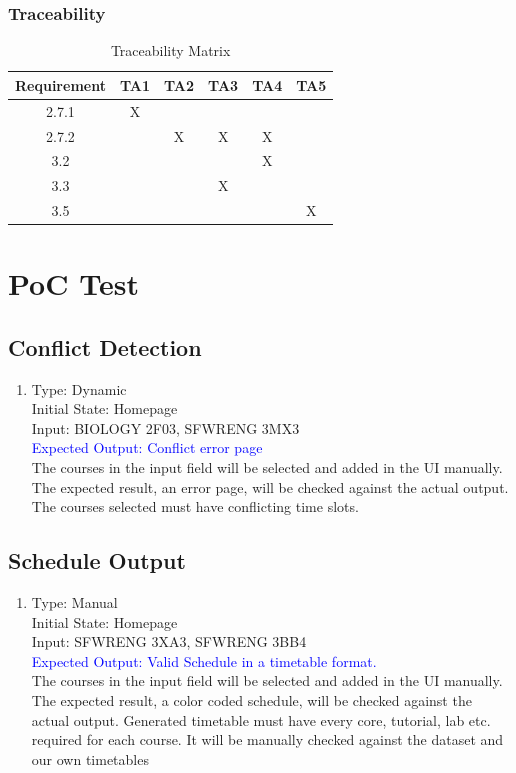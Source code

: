 \documentclass[11pt, oneside]{article}   	%
\begin{document}
\subsubsection{Traceability}
\begin{table}[h]
\begin{center}
\begin{tabular}{ | c | c | c | c | c | c | }
\hline
 Requirement & TA1 & TA2 & TA3 & TA4 & TA5  \\ 
\hline
 2.7.1 & X & & & &   \\  
\hline
 2.7.2 & & X & X & X & \\
\hline 
 3.2 & & & & X & \\ 
\hline
 3.3 & & & X & & \\
\hline
 3.5 & & & & & X \\
\hline
\end{tabular}
\end{center}
\caption{Traceability Matrix}
\end{table}
\newpage

\section{PoC Test}

\subsection{Conflict Detection}
\begin{enumerate}
\item Type: Dynamic \\
Initial State: Homepage \\
Input: BIOLOGY 2F03, SFWRENG 3MX3 \\
\textcolor{blue}{Expected Output: Conflict error page} \\
The courses in the input field will be selected and added in the UI manually. The expected result, an error page, will be checked against the actual output. The courses selected must have conflicting time slots. \\
\end{enumerate}

\subsection{Schedule Output}
\begin{enumerate}
\item Type: Manual \\
Initial State: Homepage \\
Input: SFWRENG 3XA3, SFWRENG 3BB4 \\
\textcolor{blue}{Expected Output: Valid Schedule in a timetable format.} \\
The courses in the input field will be selected and added in the UI manually. The expected result, a color coded schedule, will be checked against the actual output. Generated timetable must have every core, tutorial, lab etc. required for each course. It will be manually checked against the dataset and our own timetables \\
\end{enumerate}
\end{document}
